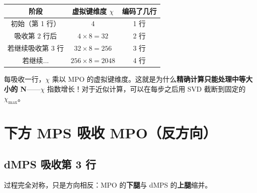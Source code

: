 \documentclass[12pt,a4paper]{article}
\begin{document}
\begin{warnbox}[键维度的指数增长]
\begin{center}
\begin{tabular}{ccc}
\toprule
\textbf{阶段} & \textbf{虚拟键维度 $\chi$} & \textbf{编码了几行} \\
\midrule
初始（第 1 行） & 4 & 1 行 \\
吸收第 2 行后 & $4 \times 8 = 32$ & 2 行 \\
若继续吸收第 3 行 & $32 \times 8 = 256$ & 3 行 \\
若继续... & $256 \times 8 = 2048$ & 4 行 \\
\bottomrule
\end{tabular}
\end{center}
每吸收一行，$\chi$ 乘以 MPO 的虚拟键维度。这就是为什么\textbf{精确计算只能处理中等大小的 N}——$\chi$ 指数增长！对于近似计算，可以在每步之后用 SVD 截断到固定的 $\chi_{\max}$。
\end{warnbox}


\section{下方 MPS 吸收 MPO（反方向）}

\subsection{dMPS 吸收第 3 行}

过程完全对称，只是方向相反：MPO 的\textbf{下腿}与 dMPS 的\textbf{上腿}缩并。
\end{document}
